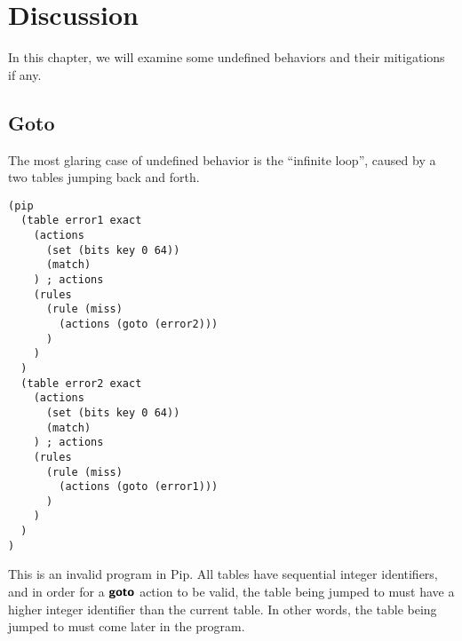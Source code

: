 \section{Discussion}
In this chapter, we will examine some undefined behaviors and their mitigations if any.

\subsection{Goto}
The most glaring case of undefined behavior is the ``infinite loop'', caused by a two tables jumping back and forth.
\begin{lstlisting}
(pip
  (table error1 exact
    (actions
      (set (bits key 0 64))
      (match)
    ) ; actions
    (rules
      (rule (miss)
        (actions (goto (error2)))
      )
    )
  )
  (table error2 exact
    (actions
      (set (bits key 0 64))
      (match)
    ) ; actions
    (rules
      (rule (miss)
        (actions (goto (error1)))
      )
    )
  )
)
\end{lstlisting}
This is an invalid program in Pip. All tables have sequential integer identifiers, and in order for a $\bm{\mathsf{{goto}}}$ action to be valid, the table being jumped to must have a higher integer identifier than the current table. In other words, the table being jumped to must come later in the program.

